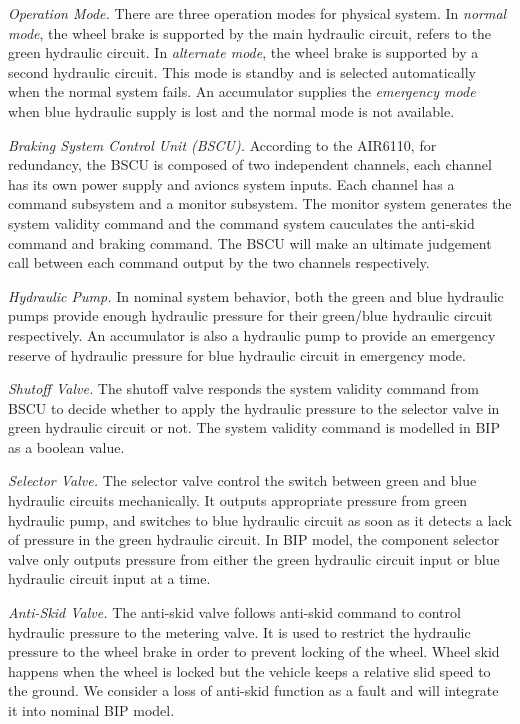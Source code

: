 \emph{Operation Mode.} There are three operation modes for physical system. In \emph{normal mode}, the wheel brake is supported by the main hydraulic circuit, refers to the green hydraulic circuit. In \emph{alternate mode}, the wheel brake is supported by a second hydraulic circuit. This mode is standby and is selected automatically when the normal system fails. An accumulator supplies the \emph{emergency mode} when blue hydraulic supply is lost and the normal mode is not available.

\emph{Braking System Control Unit (BSCU).} According to the AIR6110, for redundancy, the BSCU is composed of two independent channels, each channel has its own power supply and avioncs system inputs. Each channel has a command subsystem and a monitor subsystem. The monitor system generates the system validity command and the command system cauculates the anti-skid command and braking command. The BSCU will make an ultimate judgement call between each command output by the two channels respectively.

\emph{Hydraulic Pump.} In nominal system behavior, both the green and blue hydraulic pumps provide enough hydraulic pressure for their green/blue hydraulic circuit respectively. An accumulator is also a hydraulic pump to provide an emergency reserve of hydraulic pressure for blue hydraulic circuit in emergency mode.

\emph{Shutoff Valve.} The shutoff valve responds the system validity command from BSCU to decide whether to apply the hydraulic pressure to the selector valve in green hydraulic circuit or not. The system validity command is modelled in BIP as a boolean value.

\emph{Selector Valve.} The selector valve control the switch between green and blue hydraulic circuits mechanically. It outputs appropriate pressure from green hydraulic pump, and switches to blue hydraulic circuit as soon as it detects a lack of pressure in the green hydraulic circuit. In BIP model, the component selector valve only outputs pressure from either the green hydraulic circuit input or blue hydraulic circuit input at a time.

\emph{Anti-Skid Valve.} The anti-skid valve follows anti-skid command to control hydraulic pressure to the metering valve. It is used to restrict the hydraulic pressure to the wheel brake in order to prevent locking of the wheel. Wheel skid happens when the wheel is locked but the vehicle keeps a relative slid speed to the ground. We consider a loss of anti-skid function as a fault and will integrate it into nominal BIP model.

